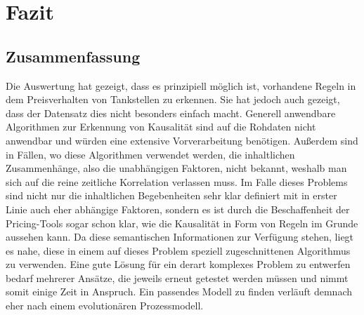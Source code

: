 \chapter{Fazit}
\label{sec:Fazit}

\section{Zusammenfassung}
Die Auswertung hat gezeigt, dass es prinzipiell möglich ist, vorhandene Regeln in dem Preisverhalten von Tankstellen zu erkennen. Sie hat jedoch auch gezeigt, dass der Datensatz dies nicht besonders einfach macht. Generell anwendbare Algorithmen zur Erkennung von Kausalität sind auf die Rohdaten nicht anwendbar und würden eine extensive Vorverarbeitung benötigen. Außerdem sind in Fällen, wo diese Algorithmen verwendet werden, die inhaltlichen Zusammenhänge, also die unabhängigen Faktoren, nicht bekannt, weshalb man sich auf die reine zeitliche Korrelation verlassen muss. Im Falle dieses Problems sind nicht nur die inhaltlichen Begebenheiten sehr klar definiert mit in erster Linie auch eher abhängige Faktoren, sondern es ist durch die Beschaffenheit der Pricing-Tools sogar schon klar, wie die Kausalität in Form von Regeln im Grunde aussehen kann. Da diese semantischen Informationen zur Verfügung stehen, liegt es nahe, diese in einem auf dieses Problem speziell zugeschnittenen Algorithmus zu verwenden. Eine gute Lösung für ein derart komplexes Problem zu entwerfen bedarf mehrerer Ansätze, die jeweils erneut getestet werden müssen und nimmt somit einige Zeit in Anspruch. Ein passendes Modell zu finden verläuft demnach eher nach einem evolutionären Prozessmodell.\\
